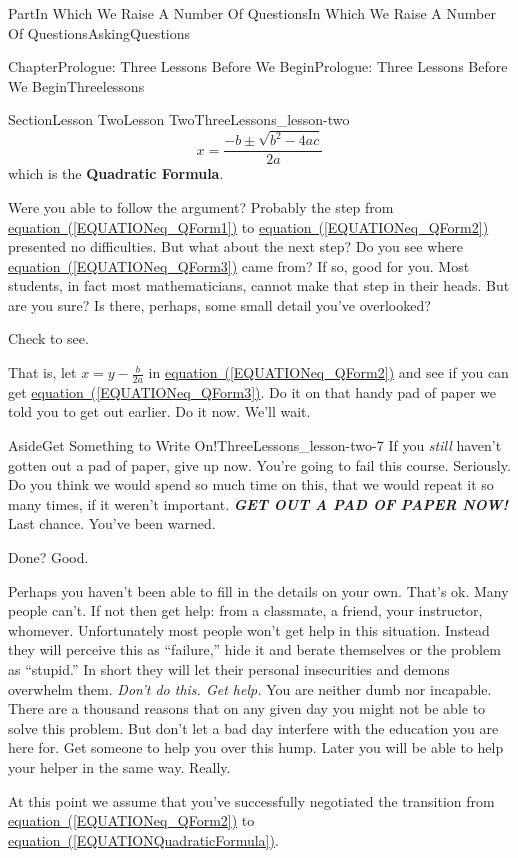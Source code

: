 \documentclass[oneside,10pt,]{book}
\newcommand{\xreffont}{\relax}
\newcommand{\alert}[1]{\textbf{\textit{#1}}}
\newcommand{\terminology}[1]{\textbf{#1}}
\numberwithin{equation}{part}
\begin{document}
\begin{partptx}{Part}{In Which We Raise A Number Of Questions}{}{In Which We Raise A Number Of Questions}{}{}{AskingQuestions}
\begin{chapterptx}{Chapter}{Prologue: Three Lessons Before We Begin}{}{Prologue: Three Lessons Before We Begin}{}{}{Threelessons}
\begin{sectionptx}{Section}{Lesson Two}{}{Lesson Two}{}{}{ThreeLessons_lesson-two}
\begin{equation}
x = \frac{-b\pm\sqrt{b^2-4ac}}{2a}\label{EQUATIONQuadraticFormula}
\end{equation}
which is the \terminology{Quadratic Formula}.         %
\par
Were you able to follow the argument?  Probably the step from \hyperref[EQUATIONeq_QForm1]{equation~({\xreffont\ref{EQUATIONeq_QForm1}})} to \hyperref[EQUATIONeq_QForm2]{equation~({\xreffont\ref{EQUATIONeq_QForm2}})} presented no difficulties.  But what about the next step?  Do you see where \hyperref[EQUATIONeq_QForm3]{equation~({\xreffont\ref{EQUATIONeq_QForm3}})} came from?  If so, good for you. Most students, in fact most mathematicians, cannot make that step in their heads.  But are you sure?  Is there, perhaps, some small detail you've overlooked?%
\par
Check to see.%
\par
That is, let \(x=y-\frac{b}{2a}\) in \hyperref[EQUATIONeq_QForm2]{equation~({\xreffont\ref{EQUATIONeq_QForm2}})} and see if you can get \hyperref[EQUATIONeq_QForm3]{equation~({\xreffont\ref{EQUATIONeq_QForm3}})}.  Do it on that handy pad of paper we told you to get out earlier.  Do it now.  We'll wait.%
\begin{aside}{Aside}{Get Something to Write On!}{ThreeLessons_lesson-two-7}%
If you \emph{still} haven't gotten out a pad of paper, give up now.  You're going to fail this course.  Seriously. Do you think we would spend so much time on this, that we would repeat it so many times, if it weren't important. \alert{GET OUT A PAD OF PAPER NOW!} Last chance. You've been warned.%
\end{aside}
Done?  Good.%
\par
Perhaps you haven't been able to fill in the details on your own.  That's ok.  Many people can't.  If not then get help: from a classmate, a friend, your instructor, whomever. Unfortunately most people won't get help in this situation. Instead they will perceive this as ``failure,'' hide it and berate themselves or the problem as ``stupid.'' In short they will let their personal insecurities and demons overwhelm them. \emph{Don't do this.  Get help.} You are neither dumb nor incapable.  There are a thousand reasons that on any given day you might not be able to solve this problem.  But don't let a bad day interfere with the education you are here for.  Get someone to help you over this hump.  Later you will be able to help your helper in the same way.  Really.%
\par
At this point we assume that you've successfully negotiated the transition from \hyperref[EQUATIONeq_QForm2]{equation~({\xreffont\ref{EQUATIONeq_QForm2}})} to \hyperref[EQUATIONQuadraticFormula]{equation~({\xreffont\ref{EQUATIONQuadraticFormula}})}.%

\end{sectionptx}
\end{chapterptx}
\end{partptx}
\end{document}
